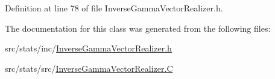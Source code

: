 Definition at line 78 of file Inverse\-Gamma\-Vector\-Realizer.\-h.



The documentation for this class was generated from the following files\-:\begin{DoxyCompactItemize}
\item 
src/stats/inc/\hyperlink{_inverse_gamma_vector_realizer_8h}{Inverse\-Gamma\-Vector\-Realizer.\-h}\item 
src/stats/src/\hyperlink{_inverse_gamma_vector_realizer_8_c}{Inverse\-Gamma\-Vector\-Realizer.\-C}\end{DoxyCompactItemize}
